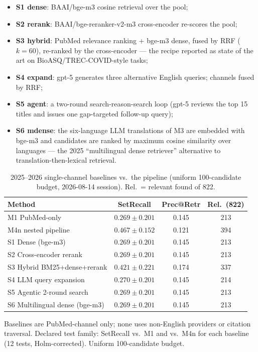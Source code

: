 \documentclass[nonacm,sigconf]{acmart}
\begin{document}
\begin{itemize}
\item \textbf{S1 dense}: BAAI/bge-m3 cosine retrieval over the pool;
\item \textbf{S2 rerank}: BAAI/bge-reranker-v2-m3 cross-encoder re-scores
the pool;
\item \textbf{S3 hybrid}: PubMed relevance ranking + bge-m3 dense, fused
by RRF ($k{=}60$), re-ranked by the cross-encoder --- the recipe reported
as state of the art on BioASQ/TREC-COVID-style tasks;
\item \textbf{S4 expand}: gpt-5 generates three alternative English
queries; channels fused by RRF;
\item \textbf{S5 agent}: a two-round search-reason-search loop (gpt-5
reviews the top 15 titles and issues one gap-targeted follow-up query);
\item \textbf{S6 mdense}: the six-language LLM translations of M3 are
embedded with bge-m3 and candidates are ranked by maximum cosine
similarity over languages --- the 2025 ``multilingual dense retriever''
alternative to translation-then-lexical retrieval.
\end{itemize}

\begin{table}[t]
\centering
\small
\setlength{\tabcolsep}{4pt}
\begin{threeparttable}
\caption{2025--2026 single-channel baselines vs.\ the pipeline (uniform
100-candidate budget, 2026-08-14 session). Rel.\ = relevant found of 822.}
\label{tab:sota}
\begin{tabular}{@{}lccc@{}}
\toprule
Method & SetRecall & Prec@Retr & Rel.\ (822) \\
\midrule
M1 PubMed-only & $0.269\pm0.201$ & 0.145 & 213 \\
M4n nested pipeline & $0.467\pm0.152$ & 0.121 & 394 \\
S1 Dense (bge-m3) & $0.269\pm0.201$ & 0.145 & 213 \\
S2 Cross-encoder rerank & $0.269\pm0.201$ & 0.145 & 213 \\
S3 Hybrid BM25+dense+rerank & $0.421\pm0.221$ & 0.174 & 337 \\
S4 LLM query expansion & $0.270\pm0.201$ & 0.145 & 214 \\
S5 Agentic 2-round search & $0.269\pm0.201$ & 0.145 & 213 \\
S6 Multilingual dense (bge-m3) & $0.269\pm0.201$ & 0.145 & 213 \\
\bottomrule
\end{tabular}
\begin{tablenotes}
\item Baselines are PubMed-channel only; none uses non-English providers
or citation traversal. Declared test family: SetRecall vs.\ M1 and vs.\
M4n for each baseline (12 tests, Holm-corrected). Uniform 100-candidate
budget.
\end{tablenotes}
\end{threeparttable}
\end{table}
\end{document}
